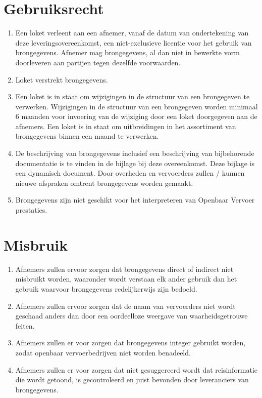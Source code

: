 \documentclass[10pt, a4paper]{article}
\begin{document}
\section{Gebruiksrecht}
\begin{enumerate}
   \item Een loket verleent aan een afnemer, vanaf de datum van ondertekening van deze leveringsovereenkomst, een niet-exclusieve licentie voor het gebruik van brongegevens. Afnemer mag brongegevens, al dan niet in bewerkte vorm doorleveren aan partijen tegen dezelfde voorwaarden.
   \item Loket verstrekt brongegevens.
   \item Een loket is in staat om wijzigingen in de structuur van een brongegeven te verwerken. Wijzigingen in de structuur van een brongegeven worden minimaal 6 maanden voor invoering van de wijziging door een loket doorgegeven aan de afnemers. Een loket is in staat om uitbreidingen in het assortiment van brongegevens binnen een maand te verwerken.
   \item De beschrijving van brongegevens inclusief een beschrijving van bijbehorende documentatie is te vinden in de bijlage bij deze overeenkomst. Deze bijlage is een dynamisch document. Door overheden en vervoerders zullen / kunnen nieuwe afspraken omtrent brongegevens worden gemaakt.
   \item Brongegevens zijn niet geschikt voor het interpreteren van Openbaar Vervoer prestaties.
\end{enumerate}

\section{Misbruik}
\begin{enumerate}
   \item Afnemers zullen ervoor zorgen dat brongegevens direct of indirect niet misbruikt worden, waaronder wordt verstaan elk ander gebruik dan het gebruik waarvoor brongegevens redelijkerwijs zijn bedoeld.
   \item Afnemers zullen ervoor zorgen dat de naam van vervoerders niet wordt geschaad anders dan door een oordeelloze weergave van waarheidsgetrouwe feiten.
   \item Afnemers zullen er voor zorgen dat brongegevens integer gebruikt worden, zodat openbaar vervoerbedrijven niet worden benadeeld.
   \item Afnemers zullen er voor zorgen dat niet gesuggereerd wordt dat reisinformatie die wordt getoond, is gecontroleerd en juist bevonden door leveranciers van brongegevens.
\end{enumerate}
\newpage
\end{document}
